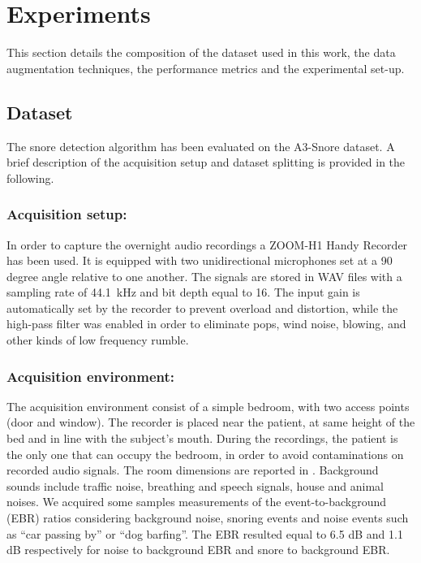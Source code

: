 \section{Experiments}
\label{sec:experiments}
This section details the composition of the dataset used in this work, the data augmentation techniques, the performance metrics and the experimental set-up.

\subsection{Dataset} 
\label{ssec:dataset}
The snore detection algorithm has been evaluated on the A3-Snore dataset. A brief description of the acquisition setup and dataset splitting is provided in the following.

\subsubsection{Acquisition setup:}
In order to capture the overnight audio recordings a ZOOM-H1 Handy Recorder has been used. It is equipped with two unidirectional microphones set at a 90 degree angle relative to one another. The signals are stored in WAV files with a sampling rate of 44.1\ kHz and bit depth equal to 16.
The input gain is automatically set by the recorder to prevent overload and distortion, while the high-pass filter was enabled in order to eliminate pops, wind noise, blowing, and other kinds of low frequency rumble.


\subsubsection{Acquisition environment:}
The acquisition environment consist of a simple bedroom, with two access points (door and window). The recorder is placed near the patient, at same height of the bed and in line with the subject's mouth. During the recordings, the patient is the only one that can occupy the bedroom, in order to avoid contaminations on recorded audio signals. The room dimensions are reported in .
Background sounds include traffic noise, breathing and speech signals, house and animal noises. We acquired some samples measurements of the event-to-background (EBR) ratios considering background noise, snoring events and noise events such as ``car passing by'' or ``dog barfing''. The EBR resulted equal to 6.5 dB and 1.1 dB respectively for noise to background EBR and snore to background EBR. 


